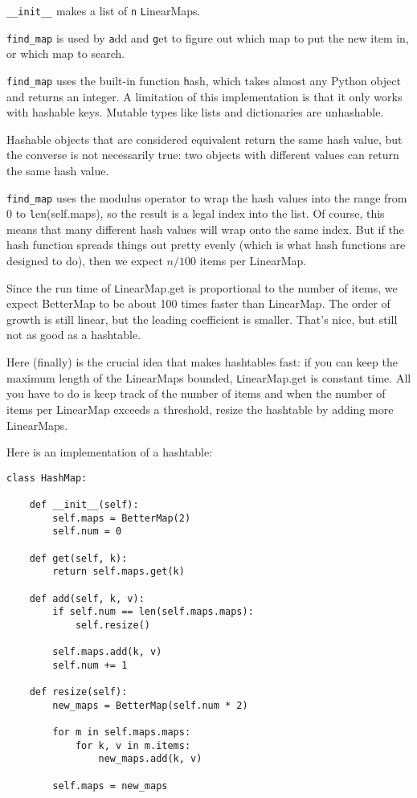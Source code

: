 \documentclass[
DIV=11,
fontsize=13,
twoside,
headinclude=false,
titlepage=firstiscover,
abstract=true,
headsepline=true,
footsepline=true,
chapterprefix=true, %
headings=big,
bibliography=totoc,%
captions=tableheading
]{scrbook}
\theoremstyle{definition}
\begin{document}
\verb"__init__" makes a list of {\texttt n} {\texttt LinearMap}s.

\verb"find_map" is used by
{\texttt add} and {\texttt get}
to figure out which map to put the
new item in, or which map to search.

\verb"find_map" uses the built-in function {\texttt hash}, which takes
almost any Python object and returns an integer.  A limitation of this
implementation is that it only works with hashable keys.  Mutable
types like lists and dictionaries are unhashable.

Hashable objects that are considered equivalent return the same hash
value, but the converse is not necessarily true: two objects with
different values can return the same hash value.

\verb"find_map" uses the modulus operator to wrap the hash values
into the range from 0 to {\texttt len(self.maps)}, so the result is a legal
index into the list.  Of course, this means that many different
hash values will wrap onto the same index.  But if the hash function
spreads things out pretty evenly (which is what hash functions
are designed to do), then we expect $n/100$ items per LinearMap.

Since the run time of {\texttt LinearMap.get} is proportional to the
number of items, we expect BetterMap to be about 100 times faster
than LinearMap.  The order of growth is still linear, but the
leading coefficient is smaller.  That's nice, but still not
as good as a hashtable.

Here (finally) is the crucial idea that makes hashtables fast: if you
can keep the maximum length of the LinearMaps bounded, {\texttt
  LinearMap.get} is constant time.  All you have to do is keep track
of the number of items and when the number of
items per LinearMap exceeds a threshold, resize the hashtable by
adding more LinearMaps.

Here is an implementation of a hashtable:

\begin{lstlisting}
class HashMap:

    def __init__(self):
        self.maps = BetterMap(2)
        self.num = 0

    def get(self, k):
        return self.maps.get(k)

    def add(self, k, v):
        if self.num == len(self.maps.maps):
            self.resize()

        self.maps.add(k, v)
        self.num += 1

    def resize(self):
        new_maps = BetterMap(self.num * 2)

        for m in self.maps.maps:
            for k, v in m.items:
                new_maps.add(k, v)

        self.maps = new_maps
\end{lstlisting}
\end{document}
